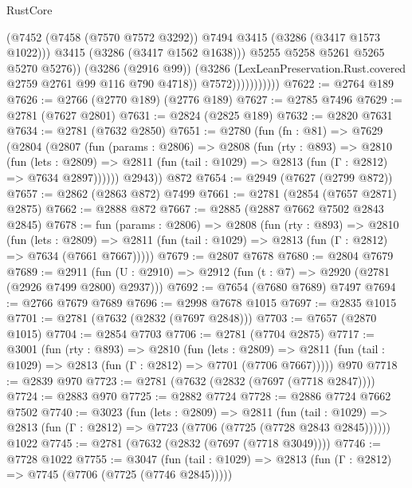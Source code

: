 \begin{lexlean}{RustCore}
\begin{coremodule}
                                (@7452
                                  (@7458 (@7570 @7572 @3292))
                                  @7494
                                  @3415
                                  (@3286 (@3417 @1573 @1022)))
                                @3415
                                (@3286 (@3417 @1562 @1638)))
                              @5255
                              @5258
                              @5261
                              @5265
                              @5270
                              @5276))
                          (@3286 (@2916 @99))
                          (@3286 (LexLeanPreservation.Rust.covered @2759 @2761 @99 @116 @790 @4718))
                          @7572)))))))))))
@7622 := @2764 @189
@7626 := @2766 (@2770 @189) (@2776 @189)
@7627 := @2785 @7496
@7629 := @2781 (@7627 @2801)
@7631 := @2824 (@2825 @189)
@7632 := @2820 @7631
@7634 := @2781 (@7632 @2850)
@7651 := @2780
    (fun (fn : @81) =>
    @7629
      (@2804
        (@2807
          (fun (params : @2806) =>
          @2808
            (fun (rty : @893) =>
            @2810
              (fun (lets : @2809) =>
              @2811 (fun (tail : @1029) => @2813 (fun (Γ : @2812) => @7634 @2897))))))
        @2943))
    @872
@7654 := @2949 (@7627 (@2799 @872))
@7657 := @2862 (@2863 @872) @7499
@7661 := @2781 (@2854 (@7657 @2871) @2875)
@7662 := @2888 @872
@7667 := @2885 (@2887 @7662 @7502 @2843 @2845)
@7678 := fun (params : @2806) =>
  @2808
    (fun (rty : @893) =>
    @2810
      (fun (lets : @2809) =>
      @2811 (fun (tail : @1029) => @2813 (fun (Γ : @2812) => @7634 (@7661 @7667)))))
@7679 := @2807 @7678
@7680 := @2804 @7679
@7689 := @2911 (fun (U : @2910) => @2912 (fun (t : @7) => @2920 (@2781 (@2926 @7499 @2800) @2937)))
@7692 := @7654 (@7680 @7689) @7497
@7694 := @2766 @7679 @7689
@7696 := @2998 @7678 @1015
@7697 := @2835 @1015
@7701 := @2781 (@7632 (@2832 (@7697 @2848)))
@7703 := @7657 (@2870 @1015)
@7704 := @2854 @7703
@7706 := @2781 (@7704 @2875)
@7717 := @3001
    (fun (rty : @893) =>
    @2810
      (fun (lets : @2809) =>
      @2811 (fun (tail : @1029) => @2813 (fun (Γ : @2812) => @7701 (@7706 @7667)))))
    @970
@7718 := @2839 @970
@7723 := @2781 (@7632 (@2832 (@7697 (@7718 @2847))))
@7724 := @2883 @970
@7725 := @2882 @7724
@7728 := @2886 @7724 @7662 @7502
@7740 := @3023
    (fun (lets : @2809) =>
    @2811
      (fun (tail : @1029) => @2813 (fun (Γ : @2812) => @7723 (@7706 (@7725 (@7728 @2843 @2845))))))
    @1022
@7745 := @2781 (@7632 (@2832 (@7697 (@7718 @3049))))
@7746 := @7728 @1022
@7755 := @3047
    (fun (tail : @1029) => @2813 (fun (Γ : @2812) => @7745 (@7706 (@7725 (@7746 @2845)))))

\end{coremodule}
\end{lexlean}

